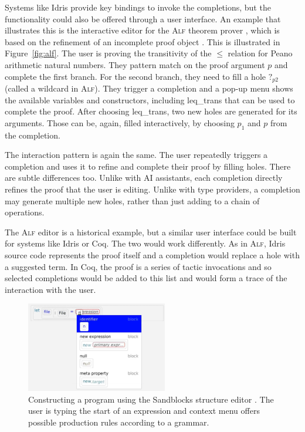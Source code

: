 \documentclass[a4paper,UKenglish,cleveref, autoref, thm-restate]{lipics-v2021}
\newcommand{\ident}[1]{\textsf{#1}}
\begin{document}
Systems like Idris provide key bindings to invoke the completions, but the functionality could
also be offered through a user interface. An example that illustrates this is the interactive editor
for the \textsc{Alf} theorem prover \cite{magnusson-1994-alf}, which is based on the refinement of
an incomplete proof object \cite{altenkirch-1994-alf}. This is illustrated in Figure~\ref{fig:alf}.
The user is proving the transitivity of the $\leq$ relation for Peano arithmetic natural numbers.
They pattern match on the proof argument $p$ and complete the first branch. For the second branch,
they need to fill a hole $?_{p2}$ (called a wildcard in \textsc{Alf}). They trigger a completion
and a pop-up menu shows the available variables and constructors, including \ident{leq\_trans} that
can be used to complete the proof. After choosing \ident{leq\_trans}, two new holes are generated
for its arguments. Those can be, again, filled interactively, by choosing $p_1$ and $p$ from the
completion.

The interaction pattern is again the same. The user repeatedly triggers a completion and uses
it to refine and complete their proof by filling holes. There are subtle differences too. Unlike
with AI assistants, each completion directly refines the proof that the user is editing. Unlike
with type providers, a completion may generate multiple new holes, rather than just adding to a
chain of operations.

The \textsc{Alf} editor is a historical example, but a similar user interface could be built for
systems like Idris or Coq. The two would work differently. As in \textsc{Alf}, Idris source code
represents the proof itself and a completion would replace a hole with a suggested term. In Coq,
the proof is a series of tactic invocations and so selected completions would be added to this
list and would form a trace of the interaction with the user.

\newpage

\begin{figure}[t]
  \includegraphics[width=0.55\textwidth]{fig/sandblocks.png}
  \caption{Constructing a program using the Sandblocks structure editor \cite{beckmann-2023-all}.
    The user is typing the start of an expression and context menu offers possible production
    rules according to a grammar.}
  \label{fig:sand}
\end{figure}
\end{document}
